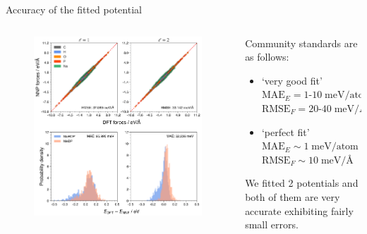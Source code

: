 \documentclass[11pt,t]{beamer}
\begin{document}
\begin{frame}{Accuracy of the fitted potential}
	\begin{columns}[t]
		\begin{column}{.55\textwidth}
			\vspace{-20pt}
			\begin{figure}
				\centering
				\includegraphics[width=1.0\textwidth]{Figures/results_nnp_accuracy_l-1_l-2.png}
			\end{figure}	
		\end{column}
		\begin{column}{.45\textwidth}
			\small
			Community standards are as follows:
			\begin{itemize}
				\item `very good fit' \\
				\noindent $\text{MAE}_E = 1\text{-}10 \; \text{meV/atom}$ \\
				\noindent $\text{RMSE}_F = 20\text{-}40 \; \text{meV/\AA}$
				\item `perfect fit' \\
				\noindent $\text{MAE}_E \sim 1 \; \text{meV/atom}$ \\
				\noindent $\text{RMSE}_F \sim 10 \; \text{meV/\AA}$
			\end{itemize}
			We fitted 2 potentials and both of them are very accurate exhibiting fairly small errors.
		\end{column}
	\end{columns}	
\end{frame}
\end{document}
